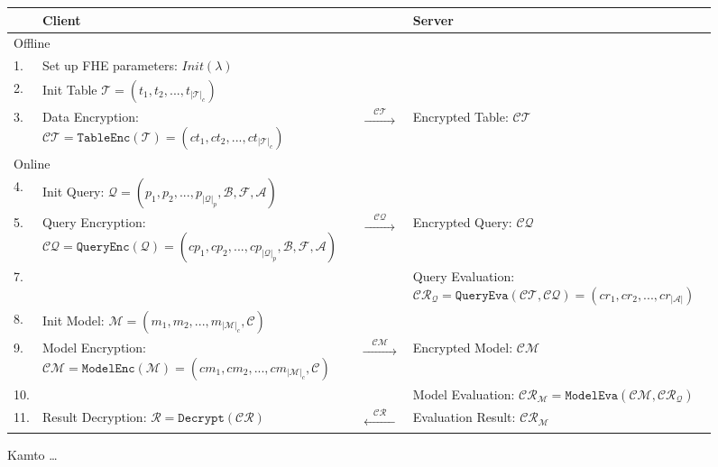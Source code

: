 \begin{figure}[t!]
    \begin{tabular}{lp{6cm}<{\raggedright }cp{6.5cm}<{\raggedright }}
    \toprule
    & Client & & Server \\
    \midrule
    \multicolumn{2}{l}{Offline} & & \\
    1.& Set up FHE parameters: $Init(\lambda)$ & & \\
    2.& Init Table $\mathcal{T} = (t_1, t_2, ..., t_{\lvert \mathcal{T} \rvert_c})$ & &\\
    3.& Data Encryption: $\mathcal{CT} = \texttt{TableEnc}(\mathcal{T}) = 
    (ct_1, ct_2, ..., ct_{\lvert \mathcal{T} \rvert_c})$ & 
    $\xrightarrow{\quad\mathcal{CT}\quad}$ & Encrypted Table: $\mathcal{CT}$ \\
    \midrule
    \multicolumn{2}{l}{Online} & & \\
    4.& Init Query: $\mathcal{Q} = (p_{1}, p_{2}, ..., p_{\lvert \mathcal{Q} \rvert_p}, \mathcal{B}, \mathcal{F}, \mathcal{A})$ & & \\
    5.& Query Encryption: $\mathcal{CQ} = \texttt{QueryEnc}(\mathcal{Q})= 
    (cp_{1}, cp_{2}, ..., cp_{\lvert \mathcal{Q} \rvert_p}, \mathcal{B}, \mathcal{F}, \mathcal{A})$ & 
    $\xrightarrow{\quad\mathcal{CQ}\quad}$ & Encrypted Query: $\mathcal{CQ}$ \\
    7.& & & Query Evaluation: $ \mathcal{CR}_{\mathcal{Q}} = \texttt{QueryEva}(\mathcal{CT}, \mathcal{CQ}) = (cr_1, cr_2,..., cr_{\lvert \mathcal{A} \rvert})$ \\
    8.& Init Model: $\mathcal{M} = (m_{1}, m_{2}, ..., m_{\lvert \mathcal{M} \rvert_c}, 
    \mathcal{C})$ & & \\
    9.& Model Encryption: $\mathcal{CM} = \texttt{ModelEnc}(\mathcal{M})
    = (cm_1, cm_2, ...,cm_{\lvert \mathcal{M} \rvert_c}, \mathcal{C})$ &
    $\xrightarrow{\quad\mathcal{CM}\quad}$ & Encrypted Model: $\mathcal{CM}$ \\
    10.& & & Model Evaluation: $ \mathcal{CR}_{\mathcal{M}} = \texttt{ModelEva}(\mathcal{CM}, \mathcal{CR}_{\mathcal{Q}})$ \\
    11.& Result Decryption: $\mathcal{R} = \texttt{Decrypt}(\mathcal{CR})$ & 
    $\xleftarrow{\quad\mathcal{CR}\quad}$ & Evaluation Result:  $\mathcal{CR}_{\mathcal{M}}$\\
    \bottomrule
    \end{tabular}
\caption{Kamto \dots}
\end{figure}

